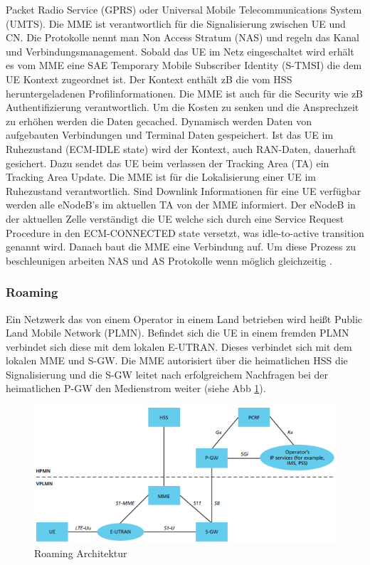 Packet Radio Service (GPRS) oder Universal Mobile Telecommunications System (UMTS). Die MME ist verantwortlich für die Signalisierung zwischen UE und CN. Die Protokolle nennt man Non Access Stratum (NAS) und regeln das Kanal und Verbindungsmanagement. Sobald das UE im Netz eingeschaltet wird erhält es vom MME eine SAE Temporary Mobile Subscriber Identity (S-TMSI) die dem UE Kontext zugeordnet ist. Der Kontext enthält zB die vom HSS heruntergeladenen Profilinformationen. Die MME ist auch für die Security wie zB Authentifizierung verantwortlich. Um die Kosten zu senken und die Ansprechzeit zu erhöhen werden die Daten gecached. Dynamisch werden Daten von aufgebauten Verbindungen und Terminal Daten gespeichert. Ist das UE im Ruhezustand (ECM-IDLE state) wird der Kontext, auch RAN-Daten, dauerhaft gesichert. Dazu sendet das UE beim verlassen der Tracking Area (TA) ein Tracking Area Update. Die MME ist für die Lokalisierung einer UE im Ruhezustand verantwortlich. Sind Downlink Informationen für eine UE verfügbar werden alle eNodeB's im aktuellen TA von der MME informiert. Der eNodeB in der aktuellen Zelle verständigt die UE welche sich durch eine Service Request Procedure in den ECM-CONNECTED state versetzt, was idle-to-active transition genannt wird. Danach baut die MME eine Verbindung auf. Um diese Prozess zu beschleunigen arbeiten NAS und AS Protokolle wenn möglich gleichzeitig \cite{Ses11}.

\subsubsection{Roaming}
\label{subsubsec:etxterne}
Ein Netzwerk das von einem Operator in einem Land betrieben wird heißt Public Land Mobile Network (PLMN). Befindet sich die UE in einem fremden PLMN verbindet sich diese mit dem lokalen E-UTRAN. Dieses verbindet sich mit dem lokalen MME und S-GW. Die MME autorisiert über die heimatlichen HSS die Signalisierung und die S-GW leitet nach erfolgreichem Nachfragen bei der heimatlichen P-GW den Medienstrom weiter (siehe Abb \ref*{fig:roaming}).
\begin{figure}[H]
	\centering
	\includegraphics[width=1\linewidth]{images/Roaming}
	\caption{Roaming Architektur \protect\cite{Ses11}}
	\label{fig:roaming}
\end{figure}

